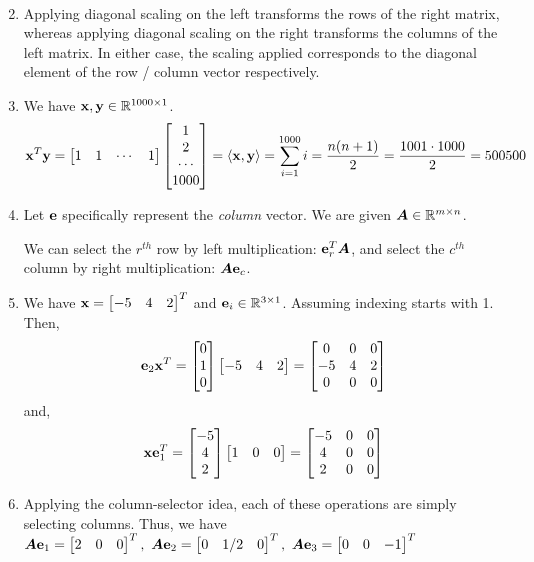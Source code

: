 \documentclass[]{exam}
\begin{document}
\begin{questions}
\begin{enumerate}[label=\arabic*.]
\begin{align*}
		\end{align*}
	\item Applying diagonal scaling on the left transforms the rows of the right matrix, whereas applying diagonal scaling on the right transforms the columns of the left matrix. In either case, the scaling applied corresponds to the diagonal element of the row / column vector respectively.
	\item We have $\boldsymbol{\mathrm{x}}, \boldsymbol{\mathrm{y}} \in \mathbb{R}^{1000 \times 1}$.
		\begin{align*}
			\boldsymbol{\mathrm{x}}^T \boldsymbol{\mathrm{y}} = \begin{bmatrix} 1 & 1 & \cdots & 1 \end{bmatrix} \begin{bmatrix} 1 \\ 2 \\ \cdots \\ 1000 \end{bmatrix} = \langle \boldsymbol{\mathrm{x}}, \boldsymbol{\mathrm{y}} \rangle = \sum^{1000}_{i=1} i = \frac{n (n + 1)}{2} = \frac{1001 \cdot 1000}{2} = 500500
		\end{align*}
	\item Let $\boldsymbol{\mathrm{e}}$ specifically represent the {\it column} vector. We are given $\boldsymbol{A} \in \mathbb{R}^{m \times n}$.

		We can select the $r^{th}$ row by left multiplication: $\boldsymbol{\mathrm{e}}_r^T \boldsymbol{A}$, and select the $c^{th}$ column by right multiplication: $\boldsymbol{A} \boldsymbol{\mathrm{e}}_c$.
	\item We have $\boldsymbol{\mathrm{x}} = \begin{bmatrix} -5 & 4 & 2 \end{bmatrix}^T$ and $\boldsymbol{\mathrm{e}}_i \in \mathbb{R}^{3 \times 1}$. Assuming indexing starts with 1. Then,
		$$ \boldsymbol{\mathrm{e}}_2 \boldsymbol{\mathrm{x}}^T = \begin{bmatrix} 0 \\ 1 \\ 0 \end{bmatrix} \begin{bmatrix} -5 & 4 & 2 \end{bmatrix} = \begin{bmatrix} 0 & 0 & 0 \\ -5 & 4 & 2 \\ 0 & 0 & 0  \end{bmatrix} $$
		and,
		$$ \boldsymbol{\mathrm{x}} \boldsymbol{\mathrm{e}}_1^T = \begin{bmatrix} -5 \\ 4 \\ 2 \end{bmatrix} \begin{bmatrix} 1 & 0 & 0 \end{bmatrix} = \begin{bmatrix} -5 & 0 & 0 \\ 4 & 0 & 0 \\ 2 & 0 & 0 \end{bmatrix} $$
	\item Applying the column-selector idea, each of these operations are simply selecting columns. Thus, we have $\boldsymbol{A} \boldsymbol{\mathrm{e}}_1 = \begin{bmatrix} 2 & 0 & 0 \end{bmatrix}^T,~\boldsymbol{A} \boldsymbol{\mathrm{e}}_2 = \begin{bmatrix} 0 & 1/2 & 0 \end{bmatrix}^T,~\boldsymbol{A} \boldsymbol{\mathrm{e}}_3 = \begin{bmatrix} 0 & 0 & -1 \end{bmatrix}^T$
\end{enumerate}

\newpage
\question
\hfill


\end{questions}
\end{document}

